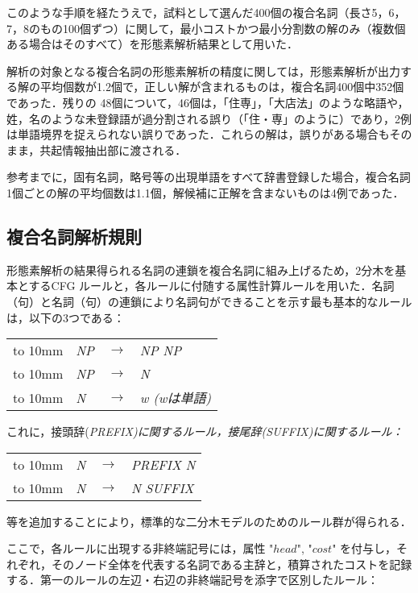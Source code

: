 このような手順を経たうえで，試料として選んだ400個の複合名詞（長さ5，6，7，8のもの100個ずつ）に関して，最小コストかつ最小分割数の解のみ（複数個ある場合はそのすべて）を形態素解析結果として用いた．

解析の対象となる複合名詞の形態素解析の精度に関しては，形態素解析が出力する解の平均個数が1.2個で，正しい解が含まれるものは，複合名詞400個中352個であった．残りの 48個について，46個は，「住専」，「大店法」のような略語や，姓，名のような未登録語が過分割される誤り（「住・専」のように）であり，2例は単語境界を捉えられない誤りであった．これらの解は，誤りがある場合もそのまま，共起情報抽出部に渡される．

参考までに，固有名詞，略号等の出現単語をすべて辞書登録した場合，複合名詞1個ごとの解の平均個数は1.1個，解候補に正解を含まないものは4例であった．

\subsection{複合名詞解析規則}\label{複合名詞解析規則}
形態素解析の結果得られる名詞の連鎖を複合名詞に組み上げるため，2分木を基本とするCFG\break
ルールと，各ルールに付随する属性計算ルールを用いた．名詞（句）と名詞（句）の連鎖により名詞句ができることを示す最も基本的なルールは，以下の3つである：

\vspace*{1mm}
\begin{tabular}{clll}
\hbox to 10mm {\hfil} & \it NP & $\rightarrow$ & \it NP NP \\
\hbox to 10mm {\hfil} & \it NP & $\rightarrow$ & \it N 	   \\
\hbox to 10mm {\hfil} & \it N  & $\rightarrow$ & \it{w} \rm{(}\it{w}は単語\rm{)} 
\end{tabular}

\vspace*{1mm}
\noindent
これに，接頭辞(\it{PREFIX}\rm{)}に関するルール，接尾辞(\it{SUFFIX}\rm{)}に関するルール：

\vspace*{1mm}
\begin{tabular}{clll}
\hbox to 10mm {\hfil} & \it N & $\rightarrow$ & \it PREFIX N \\
\hbox to 10mm {\hfil} & \it N & $\rightarrow$ & \it N SUFFIX 
\end{tabular}

\vspace*{1mm}
\noindent
等を追加することにより，標準的な二分木モデルのためのルール群が得られる．

ここで，各ルールに出現する非終端記号には，属性 "$head$", "$cost$" を付与し，それぞれ，そのノード全体を代表する名詞である主辞と，積算されたコストを記録する．第一のルールの左辺・右辺の非終端記号を添字で区別したルール：

